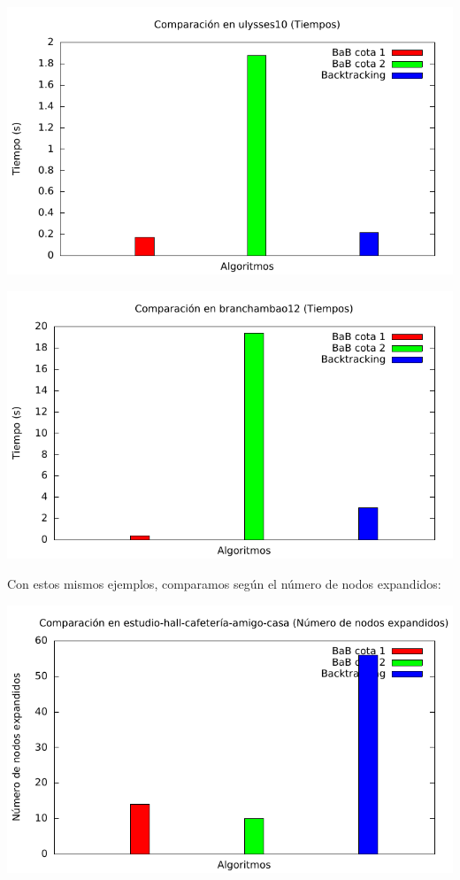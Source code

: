 \includegraphics[width=15cm]{img/barras_ulysses10_t}

\includegraphics[width=15cm]{img/barras_branchambao12_t}

Con estos mismos ejemplos, comparamos según el número de nodos expandidos:

\includegraphics[width=15cm]{img/barras_e-h-c-a-c5_nodos}

